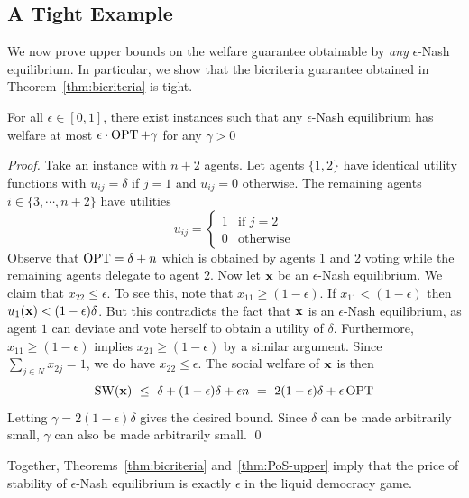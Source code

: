 \subsection{A Tight Example}\label{sec:tight}
We now prove upper bounds on the welfare guarantee obtainable by \textit{any} $\epsilon$-Nash equilibrium. 
In particular, we show that the bicriteria guarantee obtained in Theorem~\ref{thm:bicriteria} is tight.  
\begin{thm}\label{thm:PoS-upper}
For all $\epsilon\in[0,1]$, there exist instances such that any $\epsilon$-Nash equilibrium has 
welfare at most $\epsilon\cdot \operatorname{OPT} +\gamma$ for any $\gamma>0$
\end{thm}
\begin{proof}
	Take an instance with $n+2$ agents. Let agents $\{1,2\}$ have identical utility functions with $u_{ij}=\delta $ if $j=1$ and $u_{ij}=0$ otherwise. 
	The remaining agents $i\in\{3,\cdots, n+2\}$ have utilities  	
	$$
	u_{ij} = 
	\begin{cases}
	1 &\text{if } j=2  \\ 
	0 & \text{otherwise}	
	\end{cases} 
	$$ 
	Observe that $\operatorname{OPT} = \delta + n$ which is obtained by agents 1 and 2 voting while the remaining 
	agents delegate to agent $2$. Now let ${\bf x}$ be an $\epsilon$-Nash equilibrium. We claim that $x_{22}\leq \epsilon$.
	To see this, note that $x_{11}\geq (1-\epsilon)$.  If $x_{11}< (1-\epsilon)$ then $u_{1}({\bf x})<(1-\epsilon)\delta $. 
	But this contradicts the fact that ${\bf x}$ is an $\epsilon$-Nash equilibrium, as agent $1$ can deviate and vote herself to obtain a utility of $\delta$.
	Furthermore,  $x_{11}\geq (1-\epsilon)$ implies  $x_{21}\geq (1-\epsilon)$ by a similar argument. 
	Since $\sum_{j\in N} x_{2j}=1$, we do have $x_{22}\leq \epsilon$. The social welfare of ${\bf x}$ is then
	$$
	\operatorname{SW}({\bf x}) \ \leq\ \delta + (1-\epsilon)\delta + \epsilon n  
	\ =\ 2(1-\epsilon)\delta + \epsilon \operatorname{OPT}
	$$
	Letting $\gamma= 2(1-\epsilon)\delta$ gives the desired bound. Since $\delta$ can be made arbitrarily small, $\gamma$ 
	can also be made arbitrarily small.  \qed 
\end{proof}
Together, Theorems~\ref{thm:bicriteria} and~\ref{thm:PoS-upper} imply that the price of stability of $\epsilon$-Nash equilibrium is exactly $\epsilon$ in the liquid democracy game.




